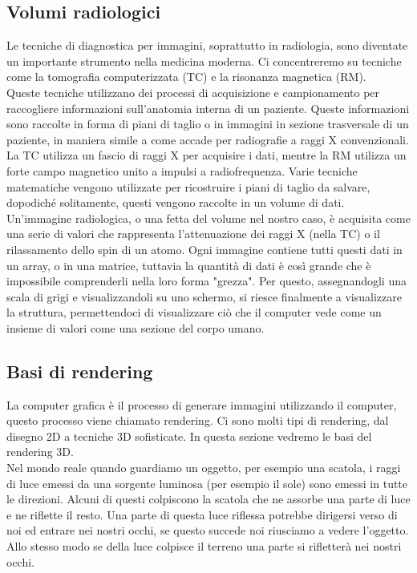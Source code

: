 \subsection{Volumi radiologici}\label{sec:volumi-radiologici}
Le tecniche di diagnostica per immagini, soprattutto in radiologia, sono diventate un importante strumento nella medicina moderna. Ci concentreremo su tecniche come la tomografia computerizzata (TC) e la risonanza magnetica (RM).
\\
Queste tecniche utilizzano dei processi di acquisizione e campionamento per raccogliere informazioni sull'anatomia interna di un paziente. Queste informazioni sono raccolte in forma di piani di taglio o in immagini in sezione trasversale di un paziente, in maniera simile a come accade per radiografie a raggi X convenzionali. La TC utilizza un fascio di raggi X per acquisire i dati, mentre la RM utilizza un forte campo magnetico unito a  impulsi a radiofrequenza. Varie tecniche matematiche vengono utilizzate per ricostruire i piani di taglio da salvare, dopodiché solitamente, questi vengono raccolte in un volume di dati.
\\
Un'immagine radiologica, o una fetta del volume nel nostro caso, è acquisita come una serie di valori che rappresenta l'attenuazione dei raggi X (nella TC) o il rilassamento dello spin di un atomo. Ogni immagine contiene tutti questi dati in un array, o in una matrice, tuttavia la quantità di dati è così grande che è impossibile comprenderli nella loro forma "grezza". Per questo, assegnandogli una scala di grigi e visualizzandoli su uno schermo, si riesce finalmente a visualizzare la struttura, permettendoci di visualizzare ciò che il computer vede come un insieme di valori come una sezione del corpo umano.

\subsection{Basi di rendering}\label{sec:basi-rendering}
La computer grafica è il processo di generare immagini utilizzando il computer, questo processo viene chiamato rendering. Ci sono molti tipi di rendering, dal disegno 2D a tecniche 3D sofisticate. In questa sezione vedremo le basi del rendering 3D.
\\
Nel mondo reale quando guardiamo un oggetto, per esempio una scatola, i raggi di luce emessi da una sorgente luminosa (per esempio il sole) sono emessi in tutte le direzioni. Alcuni di questi colpiscono la scatola che ne assorbe una parte di luce e ne riflette il resto. Una parte di questa luce riflessa potrebbe dirigersi verso di noi ed entrare nei nostri occhi, se questo succede noi riusciamo a vedere l'oggetto. Allo stesso modo se della luce colpisce il terreno una parte si rifletterà nei nostri occhi.


